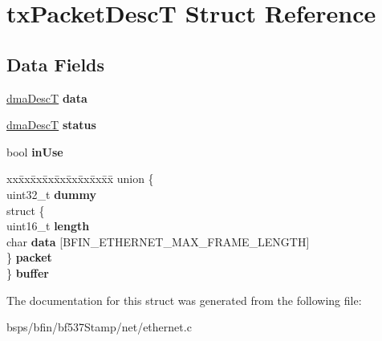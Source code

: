 \hypertarget{structtxPacketDescT}{}\section{tx\+Packet\+DescT Struct Reference}
\label{structtxPacketDescT}
\subsection*{Data Fields}
\begin{DoxyCompactItemize}
\item 
\mbox{\label{structtxPacketDescT_a789fa6291737c6cc1bf14ddb94e1408b}} 
\mbox{\hyperlink{structdmaDescS}{dma\+DescT}} {\bfseries data}
\item 
\mbox{\label{structtxPacketDescT_a77f6cac4db0e229f12d5b333b043abb3}} 
\mbox{\hyperlink{structdmaDescS}{dma\+DescT}} {\bfseries status}
\item 
\mbox{\label{structtxPacketDescT_a7beef56503bfbecf905789068aa8abec}} 
bool {\bfseries in\+Use}
\item 
\mbox{\label{structtxPacketDescT_a128451a8aa26a0a7d180119e449fc125}} 
\begin{tabbing}
xx\=xx\=xx\=xx\=xx\=xx\=xx\=xx\=xx\=\kill
union \{\\
\>uint32\_t {\bfseries dummy}\\
\>struct \{\\
\>\>uint16\_t {\bfseries length}\\
\>\>char {\bfseries data} \mbox{[}BFIN\_ETHERNET\_MAX\_FRAME\_LENGTH\mbox{]}\\
\>\} {\bfseries packet}\\
\} {\bfseries buffer}\\

\end{tabbing}\end{DoxyCompactItemize}


The documentation for this struct was generated from the following file\+:\begin{DoxyCompactItemize}
\item 
bsps/bfin/bf537\+Stamp/net/ethernet.\+c\end{DoxyCompactItemize}
